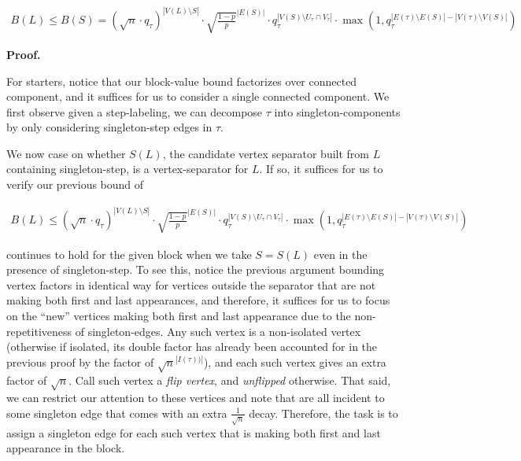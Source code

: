 \[\begin{gathered}
B(L)\leq B(S)=(\sqrt{n}\cdot q_{\tau})^{|V(L)\setminus S|}\cdot\sqrt{\frac{1-p}{p}}^{|E(S)|}\cdot q_{\tau}^{|V(S)\setminus U_{\tau}\cap V_{\tau}|}\cdot\max(1,q_{\tau}^{|E(\tau)\setminus E(S)|-|V(\tau)\setminus V(S)|})
\end{gathered}\]







\par\medskip\noindent\textbf{Proof.}\par




For starters, notice that our block-value bound factorizes over connected component, and it suffices for us to consider a single connected component.
We first observe given a step-labeling, we can decompose $\tau$ into singleton-components by only considering singleton-step edges in $\tau$.\par




We now case on whether $S(L)$, the candidate vertex separator built from $L$ containing singleton-step, is a vertex-separator for $L$. If so, it suffices for us to verify our previous bound of\par


\[\begin{gathered}
B(L)\leq(\sqrt{n}\cdot q_{\tau})^{|V(L)\setminus S|}\cdot\sqrt{\frac{1-p}{p}}^{|E(S)|}\cdot q_{\tau}^{|V(S)\setminus U_{\tau}\cap V_{\tau}|}\cdot\max(1,q_{\tau}^{|E(\tau)\setminus E(S)|-|V(\tau)\setminus V(S)|})
\end{gathered}\]


continues to hold for the given block when we take $S=S(L)$ even in the presence of singleton-step.
To see this, notice the previous argument bounding vertex factors in identical way for vertices outside the separator that are not making both first and last appearances, and therefore, it suffices for us to focus on the “new” vertices making both first and last appearance due to the non-repetitiveness of singleton-edges. Any such vertex is a non-isolated vertex (otherwise if isolated, its double factor has already been accounted for in the previous proof by the factor of $\sqrt{n}^{|I(\tau))|}$), and
each such vertex gives an extra factor of $\sqrt{n}$. Call such vertex a \emph{flip vertex}, and \emph{unflipped} otherwise. That said, we can restrict our attention to these vertices and note that are all incident to some singleton edge that comes with an extra $\frac{1}{\sqrt{n}}$ decay. Therefore, the task is to assign a singleton edge for each such vertex that is making both first and last appearance in the block.\par




